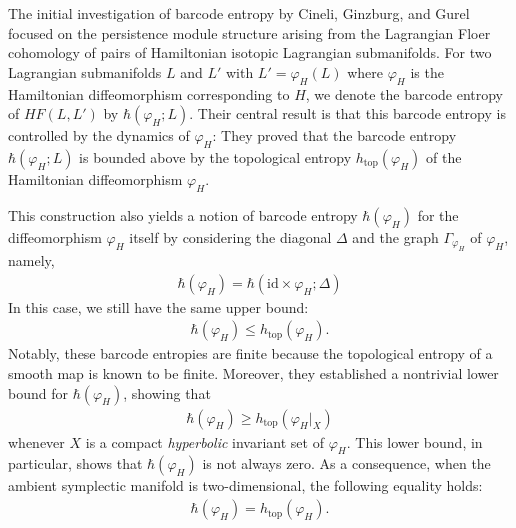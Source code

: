 \documentclass[12pt]{amsart}
\theoremstyle{definition}
\begin{document}
\vspace{0.2cm}

The initial investigation of barcode entropy by Cineli, Ginzburg, and Gurel \cite{cgg} focused on the persistence module structure arising from the Lagrangian Floer cohomology of pairs of Hamiltonian isotopic Lagrangian submanifolds. For two Lagrangian submanifolds $L$ and $L'$ with $L' = \varphi_H(L)$ where $\varphi_H$ is the Hamiltonian diffeomorphism corresponding to $H$, we denote the barcode entropy of $HF(L,L')$ by $\hbar(\varphi_H;L)$. Their central result is that this barcode entropy is controlled by the dynamics of $\varphi_H$: They proved that the barcode entropy $\hbar(\varphi_H;L)$ is bounded above by the topological entropy $h_{\textrm{top}}(\varphi_H)$ of the Hamiltonian diffeomorphism $\varphi_H$.

\vspace{0.2cm}

This construction also yields a notion of barcode entropy $\hbar(\varphi_H)$ for the diffeomorphism $\varphi_H$ itself by considering the diagonal $\Delta$ and the graph $\Gamma_{\varphi_H}$ of $\varphi_H$, namely,
\begin{align*}
    \hbar(\varphi_H) = \hbar(\textrm{id}\times \varphi_H;\Delta)
\end{align*}
In this case, we still have the same upper bound:
\begin{align*}
    \hbar(\varphi_H) \leq h_{\textrm{top}}(\varphi_H).
\end{align*}
Notably, these barcode entropies are finite because the topological entropy of a smooth map is known to be finite. Moreover, they established a nontrivial lower bound for $\hbar(\varphi_H)$, showing that
\begin{align*}
    \hbar(\varphi_H) \geq h_{\textrm{top}}(\varphi_H|_X)
\end{align*}
whenever $X$ is a compact \textit{hyperbolic} invariant set of $\varphi_H$. This lower bound, in particular, shows that $\hbar(\varphi_H)$ is not always zero. As a consequence, when the ambient symplectic manifold is two-dimensional, the following equality holds:
\begin{align*}
    \hbar(\varphi_H) =  h_{\textrm{top}}(\varphi_H).
\end{align*}
\end{document}

